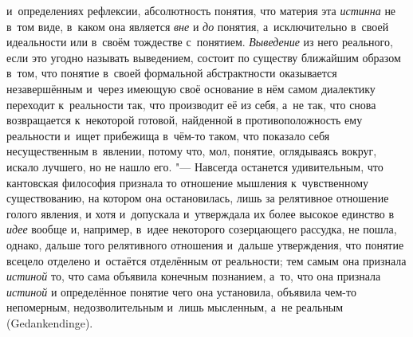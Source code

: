 и~определениях рефлексии, абсолютность понятия, что материя эта
{\em истинна} не в~том
виде, в~каком она является {\em вне}
и {\em до}
понятия, а~исключительно в~своей идеальности или в~своём
тождестве с~понятием. {\em Выведение}
из него реального, если это угодно называть выведением,
состоит по существу ближайшим образом в~том, что понятие в~своей формальной
абстрактности оказывается незавершённым и~через имеющую своё основание в
нём самом диалектику переходит к~реальности так, что производит её из себя,
а~не так, что снова возвращается к~некоторой готовой, найденной в
противоположность ему реальности и~ищет прибежища в~чём-то таком, что
показало себя несущественным в~явлении, потому что, мол,
понятие, оглядываясь вокруг, искало лучшего, но не нашло
его. "--- Навсегда останется удивительным, что кантовская
философия признала то отношение мышления к~чувственному существованию, на
котором она остановилась, лишь за релятивное отношение голого явления, и
хотя и~допускала и~утверждала их более высокое единство в
{\em идее} вообще и,
например, в~идее некоторого созерцающего рассудка, не пошла, однако, дальше
того релятивного отношения и~дальше утверждения, что понятие всецело
отделено и~остаётся отделённым от реальности; тем самым она признала
{\em истиной} то, что
сама объявила конечным познанием, а~то, что она признала
{\em истиной} и
определённое понятие чего она установила, объявила чем-то непомерным,
недозволительным и~лишь мысленным, а~не реальным (Gedan\-kendin\-ge).


